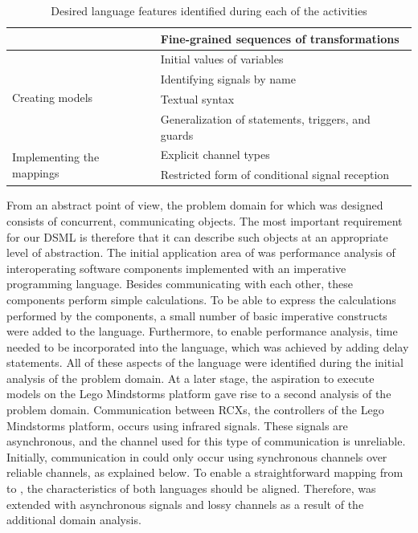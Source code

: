 \begin{table}[hbt]
\begin{tabular}{|l|l|}
                                           & Fine-grained sequences of transformations \\
\hline
\multirow{4}{*}{Creating models}           & Initial values of variables \\
                                           & Identifying signals by name \\
                                           & Textual syntax \\
                                           & Generalization of statements, triggers, and guards \\
\hline
\multirow{2}{*}{Implementing the mappings} & Explicit channel types \\
                                           & Restricted form of conditional signal reception \\
\hline
\end{tabular}
\caption{Desired language features identified during each of the activities}
\label{tab:activities_changes}
\end{table}

From an abstract point of view, the problem domain for which \SLCO was designed consists of concurrent, communicating objects.
The most important requirement for our DSML is therefore that it can describe such objects at an appropriate level of abstraction.
The initial application area of \SLCO was performance analysis of interoperating software components implemented with an imperative programming language.
Besides communicating with each other, these components perform simple calculations.
To be able to express the calculations performed by the components, a small number of basic imperative constructs were added to the language.
Furthermore, to enable performance analysis, time needed to be incorporated into the language, which was achieved by adding delay statements.
All of these aspects of the language were identified during the initial analysis of the problem domain.
At a later stage, the aspiration to execute \SLCO models on the Lego Mindstorms platform gave rise to a second analysis of the problem domain.
Communication between RCXs, the controllers of the Lego Mindstorms platform, occurs using infrared signals.
These signals are asynchronous, and the channel used for this type of communication is unreliable.
Initially, communication in \SLCO could only occur using synchronous channels over reliable channels, as explained below.
To enable a straightforward mapping from \SLCO to \NQC, the characteristics of both languages should be aligned.
Therefore, \SLCO was extended with asynchronous signals and lossy channels as a result of the additional domain analysis.

